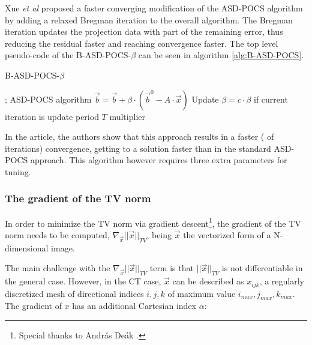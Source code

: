 Xue \textit{et al}\cite{B_ASD_POCS_beta} proposed a faster converging modification of the ASD-POCS algorithm by adding a relaxed Bregman iteration to the overall algorithm. The Bregman iteration updates the projection data with part of the remaining error, thus reducing the residual faster and reaching convergence faster. The top level pseudo-code of the B-ASD-POCS-$\beta$  can be seen in algorithm \ref{alg:B-ASD-POCS}.
%

\begin{algorithm}

\caption{B-ASD-POCS-$\beta$
\label{alg:B-ASD-POCS}}
\begin{algorithmic}[1]
;
\State ASD-POCS algorithm
\EndFor
\State $\vec{b}=\vec{b}+\beta\cdot(\vec{b}^0-A\cdot\vec{x})$
\State Update $\beta=c\cdot\beta$ if current iteration is update period $T$ multiplier 
\EndWhile

\end{algorithmic}
\end{algorithm}

In the article, the authors show that this approach results in a faster ( of iterations) convergence,  getting to a solution faster than in the standard ASD-POCS approach. This algorithm however requires three extra parameters for tuning. 


\FloatBarrier
\subsubsection{The gradient of the TV norm}

In order to minimize the TV norm via gradient descent\footnote{Special thanks to Andr\'as De\'ak \cite{Andras}.}, the gradient of the TV norm needs to be computed, $ \nabla_{\vec{x}} ||\vec x ||_{TV}$, being $\vec x$ the vectorized form of a N-dimensional image.

The main challenge with the $ \nabla_{\vec{x}} ||\vec x ||_{TV}$ term is that $ ||\vec x ||_{TV}$ is not differentiable in the general case. However, in the CT case, $\vec{x}$ can be described as $x_{ijk}$, a regularly discretized mesh of directional indices $i,j,k$ of maximum value $i_{max},j_{max},k_{max}$. The gradient of $x$ has an additional Cartesian index $\alpha$:

